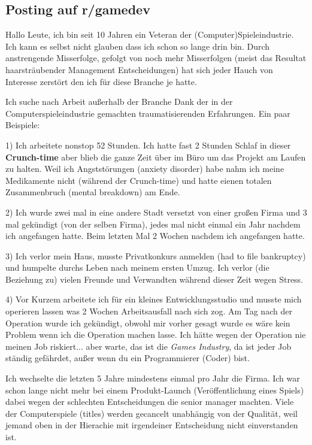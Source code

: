 \subsection*{Posting auf r/gamedev}
Hallo Leute,
ich bin seit 10 Jahren ein Veteran der (Computer)Spieleindustrie. Ich kann es selbst nicht glauben dass ich schon so lange drin bin. Durch anstrengende Misserfolge, gefolgt von noch mehr Misserfolgen (meist das Resultat haarsträubender Management Entscheidungen) hat sich jeder Hauch von Interesse zerstört den ich für diese Branche je hatte.

Ich suche nach Arbeit außerhalb der Branche Dank der in der Computerspieleindustrie gemachten traumatisierenden Erfahrungen. Ein paar Beispiele:

1) Ich arbeitete nonstop 52 Stunden. Ich hatte fast 2 Stunden Schlaf in dieser \textbf{Crunch-time} aber blieb die ganze Zeit über im Büro um das Projekt am Laufen zu halten.   
Weil ich Angststörungen (anxiety disorder) habe nahm ich meine Medikamente nicht (während der Crunch-time) und hatte eienen totalen Zusammenbruch (mental breakdown) am Ende.

2) Ich wurde zwei mal in eine andere Stadt versetzt von einer großen Firma und 3 mal gekündigt (von der selben Firma), jedes mal nicht einmal ein Jahr nachdem ich angefangen hatte. Beim letzten Mal 2 Wochen nachdem ich angefangen hatte.

3) Ich verlor mein Haus, musste Privatkonkurs anmelden (had to file bankruptcy) und humpelte durchs Leben nach meinem ersten Umzug. Ich verlor (die Beziehung zu) vielen Freunde und Verwandten während dieser Zeit wegen Stress.

4) Vor Kurzem arbeitete ich für ein kleines Entwicklungsstudio und musste mich operieren lassen was 2 Wochen Arbeitsausfall nach sich zog. Am Tag nach der Operation wurde ich gekündigt, obwohl mir vorher gesagt wurde es wäre kein Problem wenn ich die Operation machen lasse. Ich hätte wegen der Operation nie meinen Job riskiert... aber warte, das ist die \textit{Games Industry}, da ist jeder Job ständig gefährdet, außer wenn du ein Programmierer (Coder) bist.

Ich wechselte die letzten 5 Jahre mindestens einmal pro Jahr die Firma. Ich war schon lange nicht mehr bei einem Produkt-Launch (Veröffentlichung eines Spiels) dabei wegen der schlechten Entscheidungen die senior manager machten. Viele der Computerspiele (titles) werden gecancelt unabhängig von der Qualität, weil jemand oben in der Hierachie mit irgendeiner Entscheidung nicht einverstanden ist.

